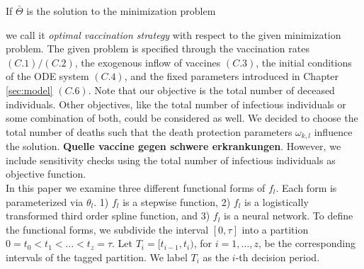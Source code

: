 If $\bar{\Theta}$ is the solution to the minimization problem 
we call it \textit{optimal vaccination strategy} with respect to the given minimization problem. The given problem is specified through the vaccination rates $(C.1)/(C.2)$, the exogenous inflow of vaccines $(C.3)$, the initial conditions of the ODE system $(C.4)$, and the fixed parameters introduced in Chapter \ref{sec:model} $(C.6)$. Note that our objective is the total number of deceased individuals. Other objectives, like the total number of infectious individuals or some combination of both, could be considered as well. We decided to choose the total number of deaths such that the death protection parameters $\omega_{k,l}$ influence the solution. \textbf{Quelle vaccine gegen schwere erkrankungen}. However, we include sensitivity checks using the total number of infectious individuals as objective function. \\


In this paper we examine three different functional forms of $f_{l}$. Each form is parameterized via $\theta_l$. 1) $f_{l}$ is a stepwise function, 2) $f_{l}$ is a logistically transformed third order spline function, and 3) $f_{l}$ is a neural network. To define the functional forms, we subdivide the interval $[0,\tau]$ into a partition $0=t_0 < t_1 < \dots < t_z = \tau$. Let $T_i = [t_{i-1}, t_{i})$, for $i = 1, \dots, z$, be the corresponding intervals of the tagged partition. We label $T_i$ as the $i$-th decision period. \\   

